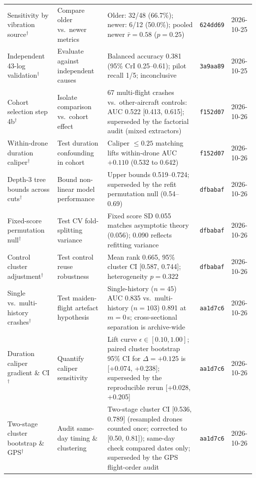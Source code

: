 \documentclass[preprint,12pt]{elsarticle}
\begin{document}
{\begin{longtable}{@{}p{}p{}p{}p{}p{}@{}}
Sensitivity by vibration source$^\dagger$ & Compare older vs.\ newer metrics & Older: 32/48 (66.7\%); newer: 6/12 (50.0\%); pooled newer $\bar r=0.58$ ($p=0.25$) & \texttt{624dd69} & 2026-10-25 \\
Independent 43-log validation$^\dagger$ & Evaluate against independent causes & Balanced accuracy 0.381 (95\% CrI 0.25--0.61); pilot recall 1/5; inconclusive & \texttt{3a9aa89} & 2026-10-25 \\
Cohort selection step 4b$^\dagger$ & Isolate comparison vs.\ cohort effect & 67 multi-flight crashes vs.\ other-aircraft controls: AUC 0.522 [0.413, 0.615]; superseded by the factorial audit (mixed extractors) & \texttt{f152d07} & 2026-10-26 \\
Within-drone duration caliper$^\dagger$ & Test duration confounding in cohort & Caliper $\le 0.25$ matching lifts within-drone AUC $+0.110$ (0.532 to 0.642) & \texttt{f152d07} & 2026-10-26 \\
Depth-3 tree bounds across cuts$^\dagger$ & Bound non-linear model performance & Upper bounds 0.519--0.724; superseded by the refit permutation null (0.54--0.69) & \texttt{dfbabaf} & 2026-10-26 \\
Fixed-score permutation null$^\dagger$ & Test CV fold-splitting variance & Fixed score SD 0.055 matches asymptotic theory (0.056); 0.090 reflects refitting variance & \texttt{dfbabaf} & 2026-10-26 \\
Control cluster adjustment$^\dagger$ & Test control reuse robustness & Mean rank 0.665, 95\% cluster CI [0.587, 0.744]; heterogeneity $p=0.322$ & \texttt{dfbabaf} & 2026-10-26 \\
Single vs.\ multi-history crashes$^\dagger$ & Test maiden-flight artefact hypothesis & Single-history ($n=45$) AUC 0.835 vs.\ multi-history ($n=103$) 0.891 at $m=0$\,s; cross-sectional separation is archive-wide & \texttt{aa1d7c6} & 2026-10-26 \\
Duration caliper gradient \& CI$^\dagger$ & Quantify caliper sensitivity & Lift curve $\epsilon \in [0.10, 1.00]$; paired cluster bootstrap 95\% CI for $\Delta=+0.125$ is [+0.074, +0.238]; superseded by the reproducible rerun [+0.028, +0.205] & \texttt{aa1d7c6} & 2026-10-26 \\
Two-stage cluster bootstrap \& GPS$^\dagger$ & Audit same-day timing \& clustering & Two-stage cluster CI [0.536, 0.789] (resampled drones counted once; corrected to [0.50, 0.81]); same-day check compared dates only; superseded by the GPS flight-order audit & \texttt{aa1d7c6} & 2026-10-26 \\

\end{longtable}}
\end{document}
